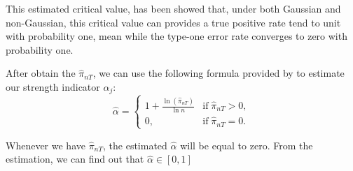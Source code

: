 \documentclass[12pt]{article}
\begin{document}
This estimated critical value, has been showed that, under both Gaussian and non-Gaussian, this critical value can provides a true positive rate tend to unit with probability one, mean while the type-one error rate converges to zero with probability one.

After obtain the $\hat{\pi}_{nT}$, we can use the following formula provided by  to estimate our strength indicator $\alpha_j$:
\[ \hat{\alpha} = \begin{cases}
1+\frac{\ln(\hat{\pi}_{nT})}{\ln n} & \text{if}\; \hat{\pi}_{nT} > 0,\\
0, & \text{if}\; \hat{\pi}_{nT} = 0.
\end{cases} \]

Whenever we have $\hat{\pi}_{nT}$, the estimated $\hat{\alpha}$ will be equal to zero. 
From the estimation, we can find out that $\hat{\alpha} \in [0,1]$



\end{document}
